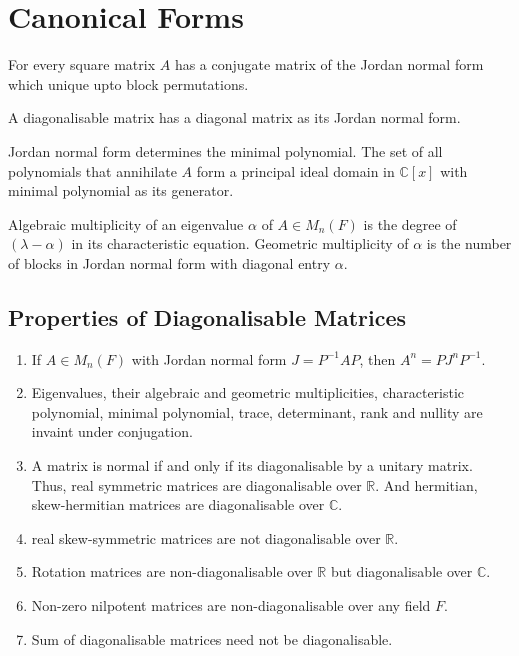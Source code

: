 \chapter{Canonical Forms}
\begin{note}
	For every square matrix $A$ has a conjugate matrix of the Jordan normal form which unique upto block permutations.
\end{note}

\begin{definition}[diagonalisable]
	A diagonalisable matrix has a diagonal matrix as its Jordan normal form.
\end{definition}

\begin{note}
	Jordan normal form determines the minimal polynomial.
	The set of all polynomials that annihilate $A$ form a principal ideal domain in $\mathbb{C}[x]$ with minimal polynomial as its generator.
\end{note}

\begin{definition}[multiplicity]
	Algebraic multiplicity of an eigenvalue $\alpha$ of $A \in M_n(F)$ is the degree of $(\lambda-\alpha)$ in its characteristic equation.
	Geometric multiplicity of $\alpha$ is the number of blocks in Jordan normal form with diagonal entry $\alpha$.
\end{definition}

\section{Properties of Diagonalisable Matrices}
\begin{enumerate}
	\item If $A \in M_n(F)$ with Jordan normal form $J = P^{-1}AP$, then $A^n = PJ^nP^{-1}$.
	\item Eigenvalues, their algebraic and geometric multiplicities, characteristic polynomial, minimal polynomial, trace, determinant, rank and nullity are invaint under conjugation.
	\item A matrix is normal if and only if its diagonalisable by a unitary matrix.
		Thus, real symmetric matrices are diagonalisable over $\mathbb{R}$.
		And hermitian, skew-hermitian matrices are diagonalisable over $\mathbb{C}$.
	\item real skew-symmetric matrices are not diagonalisable over $\mathbb{R}$.
	\item Rotation matrices are non-diagonalisable over $\mathbb{R}$ but diagonalisable over $\mathbb{C}$.
	\item Non-zero nilpotent matrices are non-diagonalisable over any field $F$.
	\item Sum of diagonalisable matrices need not be diagonalisable.
\end{enumerate}

